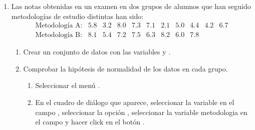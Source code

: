 \begin{enumerate}[leftmargin=*]
\item Las notas obtenidas en un examen en dos grupos de alumnos que han seguido metodologías de estudio distintas han sido:
\[
\begin{array}{lrrrrrrrrrr}
\text{Metodología A:} & 5.8 & 3.2 & 8.0 & 7.3 & 7.1 & 2.1 & 5.0 & 4.4 & 4.2 & 6.7\\
\text{Metodología B:} & 8.1 & 5.4 & 7.2 & 7.5 & 6.3 & 8.2 & 6.0 & 7.8 
\end{array}
\]
\begin{enumerate}
\item Crear un conjunto de datos con las variables  y .

\item Comprobar la hipótesis de normalidad de los datos en cada grupo.
\begin{indicacion}
\begin{enumerate}
\item Seleccionar el menú .
\item En el cuadro de diálogo que aparece, seleccionar la variable  en el campo ,
seleccionar la opción , seleccionar la variable {metodologia} en el campo  y
hacer click en el botón .
\end{enumerate}
\end{indicacion}



\end{enumerate}
\end{enumerate}
